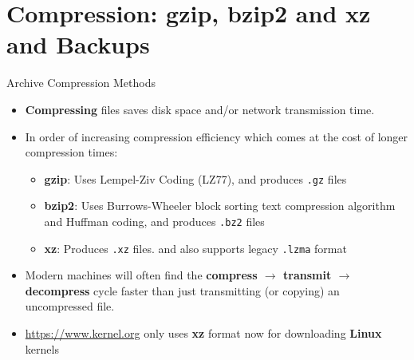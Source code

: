 \section{Compression: gzip, bzip2 and xz and Backups}

\begin{frame}
   {Archive Compression Methods}

   \begin{itemize}
      \item \textbf{Compressing} files saves
      disk space and/or network transmission time.
      \item
      In order of increasing compression efficiency
      which comes at the cost of longer compression times:
      \begin{itemize}
         \item \textbf{gzip}: Uses Lempel-Ziv Coding (LZ77), and
         produces \texttt{.gz} files
         \item \textbf{bzip2}: Uses Burrows-Wheeler block sorting
         text compression algorithm and Huffman coding, and
         produces \texttt{.bz2} files
         \item \textbf{xz}: Produces \texttt{.xz} files. and also
         supports legacy \texttt{.lzma} format

      \end{itemize}
      \item
      Modern machines will often find the
      \textbf{compress $\rightarrow$ transmit $\rightarrow$ decompress} cycle
      faster than just transmitting (or copying) an
      uncompressed file.
      \item
      \url{https://www.kernel.org} only uses \textbf{xz} format now
      for downloading \textbf{Linux} kernels
   \end{itemize}

\end{frame}

